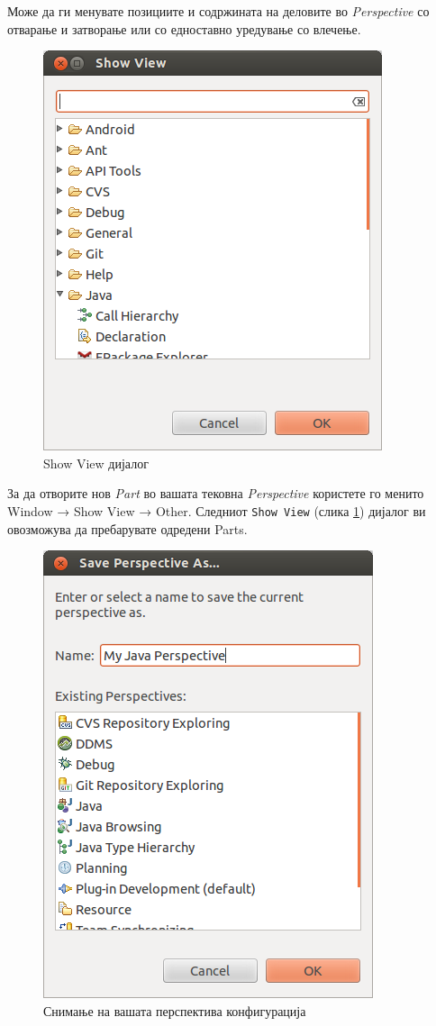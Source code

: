 Може да ги менувате позициите и содржината на деловите во \emph{Perspective} со
отварање и затворање или со едноставно уредување со влечење.

\begin{figure}[htb]
\centering
\includegraphics[scale=.5]{images/dialog}
\caption{Show View дијалог}
\label{fig:dialog}
\end{figure}

За да отворите нов \emph{Part} во вашата тековна \emph{Perspective} користете го
менито Window → Show View → Other. Следниот \texttt{Show View} (слика
\ref{fig:dialog}) дијалог ви овозможува да пребарувате одредени Parts.

\begin{figure}[htb]
\centering
\includegraphics[scale=.5]{images/save-perspective}
\caption{Снимање на вашата перспектива конфигурација}
\label{fig:save}
\end{figure}

